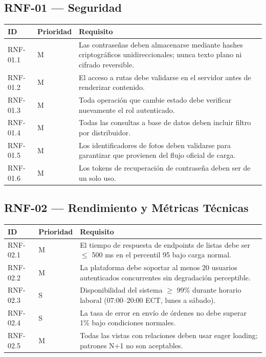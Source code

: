 \documentclass[12pt,a4paper]{report}
\begin{document}
\subsection{RNF-01 --- Seguridad}

\begin{longtable}{|p{2.5cm}|p{2cm}|p{9.5cm}|}
\hline
\textbf{ID} & \textbf{Prioridad} & \textbf{Requisito} \\ \hline
RNF-01.1 & M & Las contraseñas deben almacenarse mediante hashes criptográficos unidireccionales; nunca texto plano ni cifrado reversible. \\ \hline
RNF-01.2 & M & El acceso a rutas debe validarse en el servidor antes de renderizar contenido. \\ \hline
RNF-01.3 & M & Toda operación que cambie estado debe verificar nuevamente el rol autenticado. \\ \hline
RNF-01.4 & M & Todas las consultas a base de datos deben incluir filtro por distribuidor. \\ \hline
RNF-01.5 & M & Los identificadores de fotos deben validarse para garantizar que provienen del flujo oficial de carga. \\ \hline
RNF-01.6 & M & Los tokens de recuperación de contraseña deben ser de un solo uso. \\ \hline
\end{longtable}

\subsection{RNF-02 --- Rendimiento y Métricas Técnicas}

\begin{longtable}{|p{2.5cm}|p{2cm}|p{9.5cm}|}
\hline
\textbf{ID} & \textbf{Prioridad} & \textbf{Requisito} \\ \hline
RNF-02.1 & M & El tiempo de respuesta de endpoints de listas debe ser $\leq$ 500 ms en el percentil 95 bajo carga normal. \\ \hline
RNF-02.2 & M & La plataforma debe soportar al menos 20 usuarios autenticados concurrentes sin degradación perceptible. \\ \hline
RNF-02.3 & S & Disponibilidad del sistema $\geq$ 99\% durante horario laboral (07:00--20:00 ECT, lunes a sábado). \\ \hline
RNF-02.4 & S & La tasa de error en envío de órdenes no debe superar 1\% bajo condiciones normales. \\ \hline
RNF-02.5 & M & Todas las vistas con relaciones deben usar eager loading; patrones N+1 no son aceptables. \\ \hline
\end{longtable}
\end{document}

